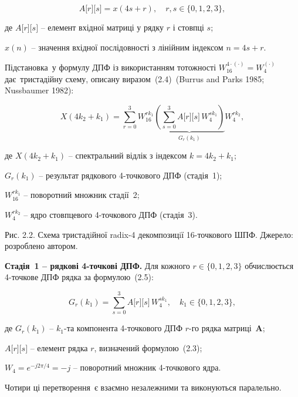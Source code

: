 \documentclass[
]{article}
\begin{document}
\begin{equation}
\tag{2.3}\label{eq:matrix-A}
A\lbrack r\rbrack\lbrack s\rbrack = x(4s + r),\quad r,s \in \{ 0,1,2,3\},
\end{equation}

де \(A\lbrack r\rbrack\lbrack s\rbrack\) -- елемент вхідної матриці у рядку \(r\) і стовпці \(s\);

\(x(n)\) -- значення вхідної послідовності з лінійним індексом \(n = 4s + r\).

Підстановка~у формулу ДПФ із використанням тотожності
\(W_{16}^{4 \cdot ( \cdot )} = W_{4}^{( \cdot )}\) дає~тристадійну схему,
описану виразом~(2.4)~(Burrus and Parks 1985; Nussbaumer 1982):

\begin{equation}
\tag{2.4}\label{eq:tristage}
X(4k_{2} + k_{1}) = \sum_{r = 0}^{3}W_{16}^{rk_{1}}\underset{G_{r}(k_{1})}{\underbrace{\left( \sum_{s = 0}^{3}A\lbrack r\rbrack\lbrack s\rbrack\, W_{4}^{sk_{1}} \right)}}W_{4}^{rk_{2}},
\end{equation}

де \(X(4k_{2} + k_{1})\) -- спектральний відлік з індексом \(k = 4k_{2} + k_{1}\);

\(G_{r}(k_{1})\) -- результат рядкового 4-точкового ДПФ (стадія~1);

\(W_{16}^{rk_{1}}\) -- поворотний множник стадії~2;

\(W_{4}^{rk_{2}}\) -- ядро стовпцевого 4-точкового ДПФ (стадія~3).

Рис. 2.2. Схема тристадiйної radix-4 декомпозицiї 16-точкового ШПФ.
Джерело: розроблено автором.

\textbf{Стадія~1 -- рядкові 4-точкові ДПФ.} Для кожного
\(r \in \{ 0,1,2,3\}\) обчислюється 4-точкове ДПФ рядка за формулою~(2.5):

\begin{equation}
\tag{2.5}\label{eq:stage1-Gr}
G_{r}(k_{1}) = \sum_{s = 0}^{3}A\lbrack r\rbrack\lbrack s\rbrack\, W_{4}^{sk_{1}},\quad k_{1} \in \{ 0,1,2,3\},
\end{equation}

де \(G_{r}(k_{1})\) -- \(k_{1}\)-та компонента 4-точкового ДПФ \(r\)-го рядка матриці~\(\mathbf{A}\);

\(A\lbrack r\rbrack\lbrack s\rbrack\) -- елемент рядка \(r\), визначений формулою~(2.3);

\(W_{4} = e^{- j2\pi/4} = - j\) -- поворотний множник 4-точкового ядра.

Чотири ці перетворення~є взаємно незалежними та виконуються паралельно.
\end{document}
